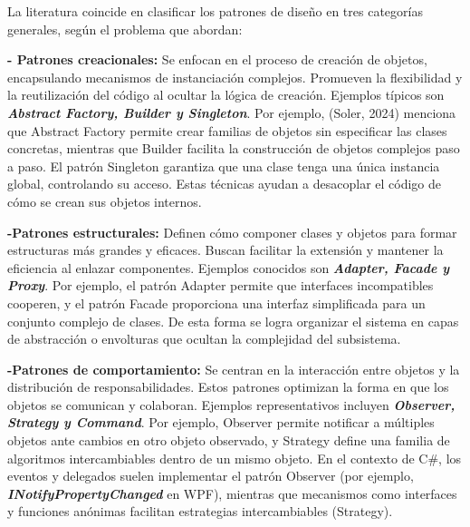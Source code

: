 \documentclass[
  11pt,
  letterpaper,
]{article}
\begin{document}
La literatura coincide en clasificar los patrones de diseño en tres
categorías generales, según el problema que abordan:

\textbf{- Patrones creacionales:} Se enfocan en el proceso de creación
de objetos, encapsulando mecanismos de instanciación complejos.
Promueven la flexibilidad y la reutilización del código al ocultar la
lógica de creación. Ejemplos típicos son \textbf{\emph{Abstract Factory,
Builder y Singleton}}. Por ejemplo, (Soler, 2024) menciona que Abstract
Factory permite crear familias de objetos sin especificar las clases
concretas, mientras que Builder facilita la construcción de objetos
complejos paso a paso. El patrón Singleton garantiza que una clase tenga
una única instancia global, controlando su acceso. Estas técnicas ayudan
a desacoplar el código de cómo se crean sus objetos internos.

\textbf{-Patrones estructurales:} Definen cómo componer clases y objetos
para formar estructuras más grandes y eficaces. Buscan facilitar la
extensión y mantener la eficiencia al enlazar componentes. Ejemplos
conocidos son \textbf{\emph{Adapter, Facade y Proxy}}. Por ejemplo, el
patrón Adapter permite que interfaces incompatibles cooperen, y el
patrón Facade proporciona una interfaz simplificada para un conjunto
complejo de clases. De esta forma se logra organizar el sistema en capas
de abstracción o envolturas que ocultan la complejidad del subsistema.

\textbf{-Patrones de comportamiento:} Se centran en la interacción entre
objetos y la distribución de responsabilidades. Estos patrones optimizan
la forma en que los objetos se comunican y colaboran. Ejemplos
representativos incluyen \textbf{\emph{Observer, Strategy y Command}}.
Por ejemplo, Observer permite notificar a múltiples objetos ante cambios
en otro objeto observado, y Strategy define una familia de algoritmos
intercambiables dentro de un mismo objeto. En el contexto de C\#, los
eventos y delegados suelen implementar el patrón Observer (por ejemplo,
\textbf{\emph{INotifyPropertyChanged}} en WPF), mientras que mecanismos
como interfaces y funciones anónimas facilitan estrategias
intercambiables (Strategy).
\end{document}
